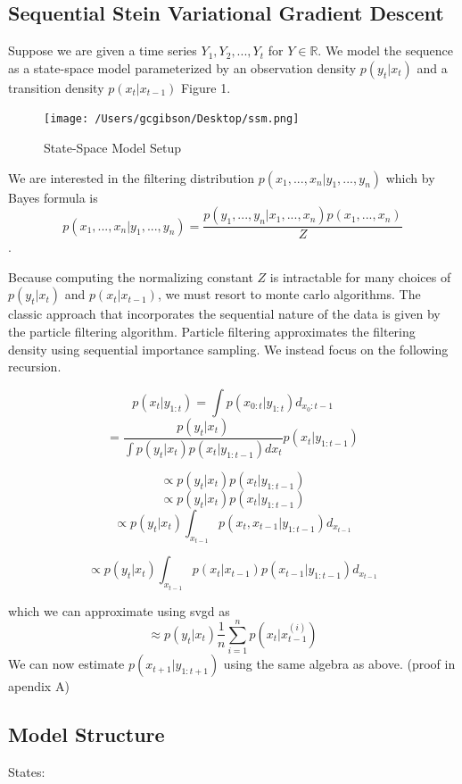 \documentclass[]{article}
\begin{document}
\subsection{Sequential Stein Variational Gradient
Descent}\label{sequential-stein-variational-gradient-descent}

Suppose we are given a time series \(Y_1,Y_2,...,Y_t\) for
\(Y \in \mathbb{R}\). We model the sequence as a state-space model
parameterized by an observation density \(p(y_t | x_t)\) and a
transition density \(p(x_t | x_{t-1})\) Figure 1.

\begin{figure}[htbp]
\centering
\texttt{[image: /Users/gcgibson/Desktop/ssm.png]}
\caption{State-Space Model Setup}
\end{figure}

We are interested in the filtering distribution
\(p(x_1,...,x_n | y_1,...,y_n)\) which by Bayes formula is
\[p(x_1,...,x_n | y_1,...,y_n) = \frac{p(y_1,...,y_n | x_1,...,x_n) p(x_1,...,x_n)}{Z}\].

Because computing the normalizing constant \(Z\) is intractable for many
choices of \(p(y_t | x_t)\) and \(p(x_t | x_{t-1})\), we must resort to
monte carlo algorithms. The classic approach that incorporates the
sequential nature of the data is given by the particle filtering
algorithm. Particle filtering approximates the filtering density using
sequential importance sampling. We instead focus on the following
recursion.

\[p(x_t | y_{1:t}) = \int p(x_{0:t} | y_{1:t})d_{x_0:t-1}\]
\[=\frac{p(y_t | x_t)}{\int p(y_t|x_t)p(x_t | y_{1:t-1})dx_t}p(x_t | y_{1:t-1})\]

\[\propto p(y_t|x_t)p(x_t | y_{1:t-1})\]
\[\propto p(y_t|x_t)p(x_t | y_{1:t-1})\]
\[\propto p(y_t|x_t)\int_{x_{t-1}}p(x_t,x_{t-1} | y_{1:t-1})d_{x_{t-1}}\]

\[\propto p(y_t|x_t)\int_{x_{t-1}}p(x_t |x_{t-1} )p(x_{t-1}| y_{1:t-1})d_{x_{t-1}}\]

which we can approximate using svgd as
\[\approx p(y_t|x_t) \frac{1}{n}\sum_{i=1}^n p(x_t | x_{t-1}^{(i)})\] We
can now estimate \(p(x_{t+1}|y_{1:t+1})\) using the same algebra as
above. (proof in apendix A)

\subsection{Model Structure}\label{model-structure}

States:
\end{document}
